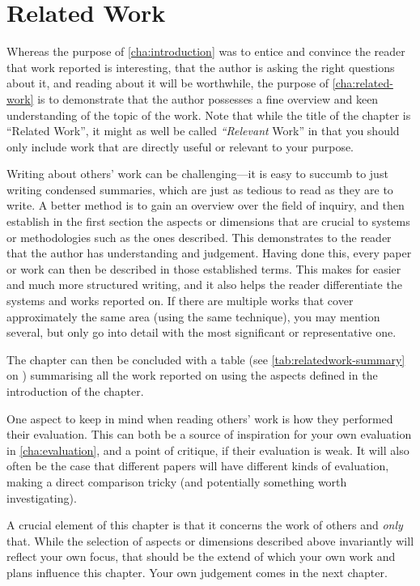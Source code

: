 \chapter{Related Work}
\label{cha:related-work}

Whereas the purpose of \autoref{cha:introduction} was to entice and
convince the reader that work reported is interesting, that the author
is asking the right questions about it, and reading about it will be
worthwhile, the purpose of \autoref{cha:related-work} is to
demonstrate that the author possesses a fine overview and keen
understanding of the topic of the work.  Note that while the title of
the chapter is ``Related Work'', it might as well be called
\emph{``Relevant} Work'' in that you should only include work that are
directly useful or relevant to your purpose. 

Writing about others' work can be challenging---it is easy to succumb to just
writing condensed summaries, which are just as tedious to read as they are to
write.  A better method is to gain an overview over the field of inquiry, and
then establish in the first section the aspects or dimensions that are crucial
to systems or methodologies such as the ones described. This demonstrates to
the reader that the author has understanding and judgement. Having done this,
every paper or work can then be described in those established terms. This
makes for easier and much more structured writing, and it also helps the
reader differentiate the systems and works reported on. If there are multiple
works that cover approximately the same area (\eg using the same technique),
you may mention several, but only go into detail with the most significant or
representative one.

The chapter can then be concluded with a table (see
\autoref{tab:relatedwork-summary} on )
summarising all the work reported on using the aspects defined in the
introduction of the chapter.

One aspect to keep in mind when reading others' work is how they performed
their evaluation. This can both be a source of inspiration for your own
evaluation in \autoref{cha:evaluation}, and a point of critique, if their
evaluation is weak. It will also often be the case that different papers will
have different kinds of evaluation, making a direct comparison tricky (and
potentially something worth investigating).

A crucial element of this chapter is that it concerns the work of
others and \emph{only} that. While the selection of aspects or
dimensions described above invariantly will reflect your own focus,
that should be the extend of which your own work and plans influence
this chapter.  Your own judgement comes in the next chapter.

